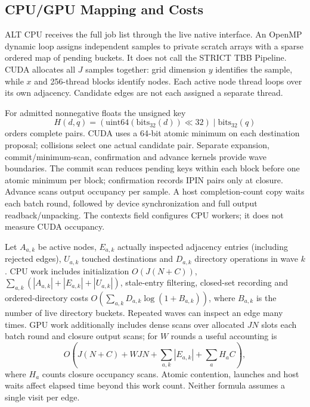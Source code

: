 \subsection{CPU/GPU Mapping and Costs}
ALT CPU receives the full job list through the live native interface. An OpenMP dynamic loop assigns independent samples to private scratch arrays with a sparse ordered map of pending buckets. It does not call the STRICT TBB Pipeline. CUDA allocates all $J$ samples together: grid dimension $y$ identifies the sample, while $x$ and 256-thread blocks identify nodes. Each active node thread loops over its own adjacency. Candidate edges are not each assigned a separate thread.

For admitted nonnegative floats the unsigned key
\begin{equation}
 H(d,q)=(\mathrm{uint64}(\mathrm{bits}_{32}(d))\ll32)
          \mathbin{|}\mathrm{bits}_{32}(q)
\end{equation}
orders complete pairs. CUDA uses a 64-bit atomic minimum on each destination proposal; collisions select one actual candidate pair. Separate expansion, commit/minimum-scan, confirmation and advance kernels provide wave boundaries. The commit scan reduces pending keys within each block before one atomic minimum per block; confirmation records IPIN pairs only at closure. Advance scans output occupancy per sample. A host completion-count copy waits each batch round, followed by device synchronization and full output readback/unpacking. The contexts field configures CPU workers; it does not measure CUDA occupancy.

Let $A_{a,k}$ be active nodes, $E_{a,k}$ actually inspected adjacency entries (including rejected edges), $U_{a,k}$ touched destinations and $D_{a,k}$ directory operations in wave $k$. CPU work includes initialization $O(J(N+C))$, $\sum_{a,k}(|A_{a,k}|+|E_{a,k}|+|U_{a,k}|)$, stale-entry filtering, closed-set recording and ordered-directory costs $O(\sum_{a,k}D_{a,k}\log(1+B_{a,k}))$, where $B_{a,k}$ is the number of live directory buckets. Repeated waves can inspect an edge many times. GPU work additionally includes dense scans over allocated $JN$ slots each batch round and closure output scans; for $W$ rounds a useful accounting is
\begin{equation}
 O\!\left(J(N+C)+WJN+\sum_{a,k}|E_{a,k}|+\sum_a H_a C\right),
\end{equation}
where $H_a$ counts closure occupancy scans. Atomic contention, launches and host waits affect elapsed time beyond this work count. Neither formula assumes a single visit per edge.

